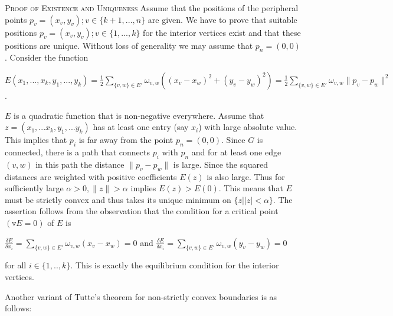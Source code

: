 \documentclass[english]{article}
\begin{document}
\textsc {Proof of Existence and Uniqueness}  Assume that the positions of the peripheral points $p_v = (x_v,y_v); v \in \{k+1,...,n\}$ are given. We have to prove that suitable positions $p_v = (x_v,y_v); v \in \{1,...,k\}$ for the interior vertices exist and that these positions are unique. Without loss of generality we may assume that $p_n = (0,0)$. Consider the function
\begin{center}
$E(x_1,...,x_k,y_1,...,y_k) = \frac{1}{2} \sum\limits_{\{v,w\} \in E'} \omega_{v,w}((x_v - x_w)^2 + (y_v - y_w)^2) 
= \frac{1}{2} \sum\limits_{\{v,w\} \in E'} \omega_{v,w} \|p_v - p_w\|^2$. \\
\end{center}
$E$ is a quadratic function that is non-negative everywhere. Assume that $z=(x_1,...x_k,y_1,...y_k)$ has at least one entry (say $x_i$) with large absolute value. This implies that $p_i$ is far away from the point $p_n = (0,0)$. Since $G$ is connected, there is a path that connects $p_i$ with $p_n$ and for at least one edge $(v,w)$ in this path the distance $\|p_v - p_w\|$ is large. Since the squared distances are weighted with positive coefficients $E(z)$ is also large. Thus for sufficiently large $\alpha > 0, \|z\| > \alpha$ implies $E(z) > E(0)$. This means that $E$ must be strictly convex and thus takes its unique minimum on $\{z | |z| < \alpha \}$. The assertion follows from the observation that the condition for a critical point $(\triangledown E = 0)$ of $E$ is
\begin{center}
$\frac{\delta E}{\delta x_i} = \sum\limits_{\{v,w\} \in E'} \omega_{v,w}(x_v - x_w) = 0$ and $\frac{\delta E}{\delta x_i} = \sum\limits_{\{v,w\} \in E'} \omega_{v,w}(y_v - y_w) = 0$
\end{center}
for all $i \in \{1,..,k\}$. This is exactly the equilibrium condition for the interior vertices.

Another variant of Tutte's theorem for non-strictly convex boundaries is as follows:
\end{document}
